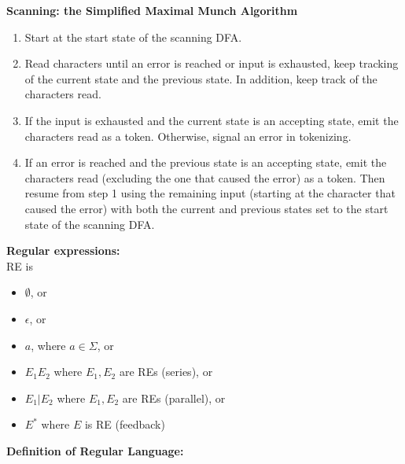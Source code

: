 \documentclass[12pt]{article}
\begin{document}
\clearpage
\noindent
\textbf{Scanning: the Simplified Maximal Munch Algorithm}\\
\begin{enumerate}
	\item Start at the start state of the scanning DFA.
	\item Read characters until an error is reached or input is exhausted, keep tracking of the current state and the previous state. In addition, keep track of the characters read.
	\item If the input is exhausted and the current state is an accepting state, emit the characters read as a token. Otherwise, signal an error in tokenizing.
	\item If an error is reached and the previous state is an accepting state, emit the characters read (excluding the one that caused the error) as a token. Then resume from step 1 using the remaining input (starting at the character that caused the error) with both the current and previous states set to the start state of the scanning DFA. 
\end{enumerate}


\noindent
\textbf{Regular expressions:}\\

\noindent
RE is 
\begin{itemize}
	\renewcommand\labelitemi{--}
	\item $\emptyset$, or
	\item $\epsilon$, or
	\item $a$, where $a \in \Sigma$, or
	\item $E_1E_2$ where $E_1, E_2$ are REs (series), or
	\item $E_1|E_2$ where $E_1, E_2$ are REs (parallel), or
	\item $E^{\ast}$ where $E$ is RE (feedback)
\end{itemize}

\noindent
\textbf{Definition of Regular Language:}\\
\end{document}
